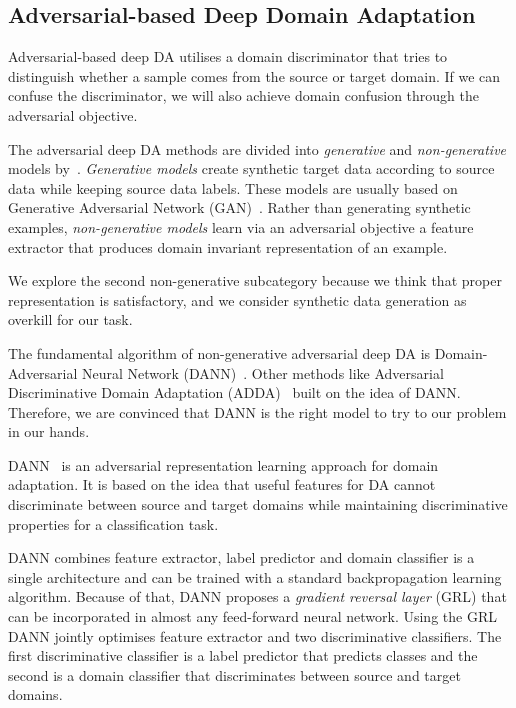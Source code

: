 \subsection{Adversarial-based Deep Domain Adaptation}
\label{adversarial_da}

Adversarial-based deep DA utilises a domain discriminator
that tries to distinguish whether a sample comes from the source or target domain.
If we can confuse the discriminator,
we will also achieve domain confusion through the adversarial objective.

The adversarial deep DA methods are divided into \textit{generative} and \textit{non-generative} models by~\cite{wang2018}.
\textit{Generative models} create synthetic target data according to source data while keeping source data labels.
These models are usually based on Generative Adversarial Network (GAN)~\cite{goodfellow2014}.
Rather than generating synthetic examples,
\textit{non-generative models} learn via an adversarial objective a feature extractor
that produces domain invariant representation of an example.

We explore the second non-generative subcategory
because we think that proper representation is satisfactory,
and we consider synthetic data generation as overkill for our task.

The fundamental algorithm of non-generative adversarial deep DA is
Domain-Adversarial Neural Network (DANN)~\cite{ganin2016}.
Other methods like Adversarial Discriminative Domain Adaptation (ADDA)~\cite{tzeng2017} built on the idea of DANN.
Therefore, we are convinced that DANN is the right model to try to our problem in our hands.

DANN~\cite{ganin2016} is an adversarial representation learning approach for domain adaptation.
It is based on the idea that useful features for DA
cannot discriminate between source and target domains
while maintaining discriminative properties for a classification task.

DANN combines feature extractor, label predictor and domain classifier is a single architecture
and can be trained with a standard backpropagation learning algorithm.
Because of that, DANN proposes a \textit{gradient reversal layer} (GRL)
that can be incorporated in almost any feed-forward neural network.
Using the GRL DANN jointly optimises feature extractor and two discriminative classifiers.
The first discriminative classifier is a label predictor that predicts classes and the second is a domain classifier
that discriminates between source and target domains.

